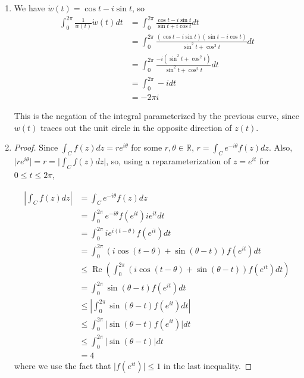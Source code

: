 \documentclass[11pt, letterpaper]{article}
\begin{document}
\thispagestyle{firststyle}


\begin{enumerate}
  \item We have $\dot w(t) = \cos t - i \sin t$, so \begin{align*}
    \int_0^{2\pi} \frac{1}{w(t)} \dot w(t) dt 
    &= \int_0^{2\pi} \frac{\cos t - i \sin t}{\sin t + i \cos t} dt \\
    &= \int_0^{2\pi} \frac{(\cos t - i \sin t)(\sin t - i \cos t)}{\sin^2 t + \cos^2 t} dt \\
    &=\int_0^{2\pi} \frac{-i (\sin^2 t + \cos^2 t)}{\sin^2 t + \cos^2 t} dt \\
    &= \int_0^{2\pi} -i dt \\
    &= -2\pi i
  \end{align*}

  This is the negation of the integral parameterized by the previous curve, since $w(t)$ traces out the unit circle in the opposite direction of $z(t)$.

  \item \begin{proof}
    Since $\int_C f(z) dz = re^{i\theta}$ for some $r, \theta \in \mathbb R$, $r = \int_C e^{-i\theta} f(z) dz$. Also, $\vert re^{i \theta} \vert = r = \vert \int_C f(z) dz \vert$, so, using a reparameterization of $z = e^{it}$ for $0 \leq t \leq 2\pi$,
    
    \begin{align*}
      \left\vert \int_C f(z) dz \right\vert 
      &= \int_C e^{-i\theta} f(z) dz \\
      &= \int_0^{2\pi} e^{-i \theta} f(e^{it}) ie^{it} dt \\
      &= \int_0^{2\pi} ie^{i(t - \theta)} f(e^{it}) dt \\
      &= \int_0^{2\pi} (i\cos (t - \theta) + \sin(\theta - t)) f(e^{it}) dt \\
      &\leq \operatorname{Re}\left( \int_0^{2\pi} (i\cos (t - \theta) + \sin(\theta - t)) f(e^{it}) dt \right) \\
      &= \int_0^{2\pi} \sin(\theta - t) f(e^{it}) dt \\
      &\leq \left\vert \int_0^{2\pi} \sin (\theta - t) f(e^{it}) dt \right\vert \\
      &\leq \int_0^{2\pi} \vert \sin(\theta - t) f(e^{it}) \vert dt \\
      &\leq \int_0^{2\pi} \vert \sin(\theta - t) \vert dt\\
      &= 4 
    \end{align*}
    where we use the fact that $\vert f(e^{it}) \vert \leq 1$ in the last inequality.
  \end{proof}


\end{enumerate}
\end{document}

